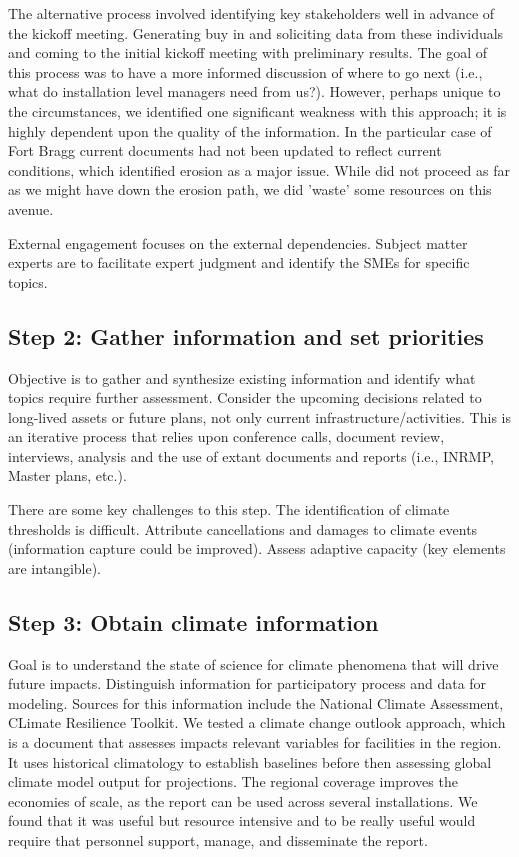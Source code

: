 \documentclass[10pt]{amsart}
\begin{document}
The alternative process involved identifying key stakeholders well in advance of the kickoff meeting.
Generating buy in and soliciting data from these individuals and coming to the initial kickoff meeting with preliminary results.
The goal of this process was to have a more informed discussion of where to go next (i.e., what do installation level managers need from us?).
However, perhaps unique to the circumstances, we identified one significant weakness with this approach; it is highly dependent upon the quality of the information.
In the particular case of Fort Bragg current documents had not been updated to reflect current conditions, which identified erosion as a major issue. 
While did not proceed as far as we might have down the erosion path, we did 'waste' some resources on this avenue.

External engagement focuses on the external dependencies.
Subject matter experts are to facilitate expert judgment and identify the SMEs for specific topics.

\subsection{Step 2: Gather information and set priorities}
Objective is to gather and synthesize existing information and identify what topics require further assessment.
Consider the upcoming decisions related to long-lived assets or future plans, not only current infrastructure/activities.
This is an iterative process that relies upon conference calls, document review, interviews, analysis and the use of extant documents and reports (i.e., INRMP, Master plans, etc.).

There are some key challenges to this step.
The identification of climate thresholds is difficult.
Attribute cancellations and damages to climate events (information capture could be improved).
Assess adaptive capacity (key elements are intangible).

\subsection{Step 3: Obtain climate information}
Goal is to understand the state of science for climate phenomena that will drive future impacts.
Distinguish information for participatory process and data for modeling.
Sources for this information include the National Climate Assessment, CLimate Resilience Toolkit.
We tested a climate change outlook approach, which is a document that assesses impacts relevant variables for facilities in the region.
It uses historical climatology to establish baselines before then assessing global climate model output for projections.
The regional coverage improves the economies of scale, as the report can be used across several installations.
We found that it was useful but resource intensive and to be really useful would require that personnel support, manage, and disseminate the report.
\end{document}
